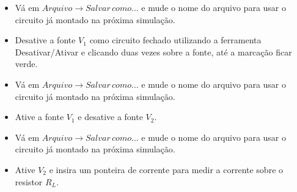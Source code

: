 
\begin{itemize}
  \item Vá em $Arquivo\rightarrow Salvar \, como...$ e mude o nome do arquivo para usar o circuito já montado na próxima simulação.
\end{itemize}


\begin{itemize}
  \item Desative a fonte $V_1$ como circuito fechado utilizando a ferramenta Desativar/Ativar e clicando duas vezes sobre a fonte, até a marcação ficar verde.
\end{itemize}


\begin{itemize}
  \item Vá em $Arquivo\rightarrow Salvar \, como...$ e mude o nome do arquivo para usar o circuito já montado na próxima simulação.
\end{itemize}


\begin{itemize}
  \item Ative a fonte $V_1$ e desative a fonte $V_2$.
\end{itemize}


\begin{itemize}

  \item Vá em $Arquivo\rightarrow Salvar \, como...$ e mude o nome do arquivo para usar o circuito já montado na próxima simulação.
\end{itemize}


\begin{itemize}
  \item Ative $V_2$ e insira um ponteira de corrente para medir a corrente sobre o resistor $R_L$.
\end{itemize}


